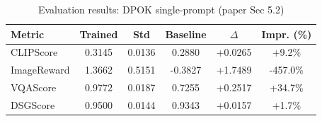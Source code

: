 \begin{table}[h]
\centering
\caption{Evaluation results: DPOK single-prompt (paper Sec 5.2)}
\label{tab:eval}
\begin{tabular}{lccccc}
\toprule
Metric & Trained & Std & Baseline & $\Delta$ & Impr. (\%) \\
\midrule
CLIPScore & 0.3145 & 0.0136 & 0.2880 & +0.0265 & +9.2\% \\
ImageReward & 1.3662 & 0.5151 & -0.3827 & +1.7489 & -457.0\% \\
VQAScore & 0.9772 & 0.0187 & 0.7255 & +0.2517 & +34.7\% \\
DSGScore & 0.9500 & 0.0144 & 0.9343 & +0.0157 & +1.7\% \\
\bottomrule
\end{tabular}
\end{table}